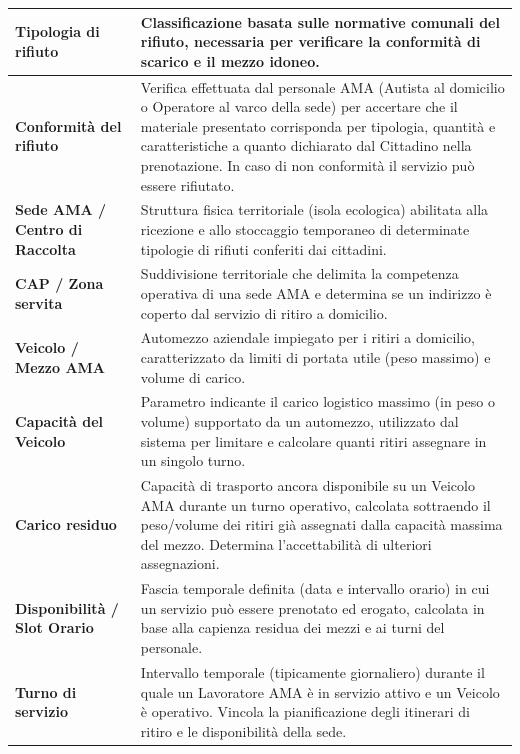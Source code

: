 \begin{center}
\begin{longtable}{|p{4.2cm}|p{10.5cm}|}
\textbf{Tipologia di rifiuto} & Classificazione basata sulle normative comunali del rifiuto, necessaria per verificare la conformità di scarico e il mezzo idoneo. \\ \hline

\textbf{Conformità del rifiuto} & Verifica effettuata dal personale AMA (Autista al domicilio o Operatore al varco della sede) per accertare che il materiale presentato corrisponda per tipologia, quantità e caratteristiche a quanto dichiarato dal Cittadino nella prenotazione. In caso di non conformità il servizio può essere rifiutato. \\ \hline

\textbf{Sede AMA / Centro di Raccolta} & Struttura fisica territoriale (isola ecologica) abilitata alla ricezione e allo stoccaggio temporaneo di determinate tipologie di rifiuti conferiti dai cittadini. \\ \hline

\textbf{CAP / Zona servita} & Suddivisione territoriale che delimita la competenza operativa di una sede AMA e determina se un indirizzo è coperto dal servizio di ritiro a domicilio. \\ \hline

\textbf{Veicolo / Mezzo AMA} & Automezzo aziendale impiegato per i ritiri a domicilio, caratterizzato da limiti di portata utile (peso massimo) e volume di carico. \\ \hline

\textbf{Capacità del Veicolo} & Parametro indicante il carico logistico massimo (in peso o volume) supportato da un automezzo, utilizzato dal sistema per limitare e calcolare quanti ritiri assegnare in un singolo turno. \\ \hline

\textbf{Carico residuo} & Capacità di trasporto ancora disponibile su un Veicolo AMA durante un turno operativo, calcolata sottraendo il peso/volume dei ritiri già assegnati dalla capacità massima del mezzo. Determina l'accettabilità di ulteriori assegnazioni. \\ \hline

\textbf{Disponibilità / Slot Orario} & Fascia temporale definita (data e intervallo orario) in cui un servizio può essere prenotato ed erogato, calcolata in base alla capienza residua dei mezzi e ai turni del personale. \\ \hline

\textbf{Turno di servizio} & Intervallo temporale (tipicamente giornaliero) durante il quale un Lavoratore AMA è in servizio attivo e un Veicolo è operativo. Vincola la pianificazione degli itinerari di ritiro e le disponibilità della sede. \\ \hline


\end{longtable}
\end{center}
